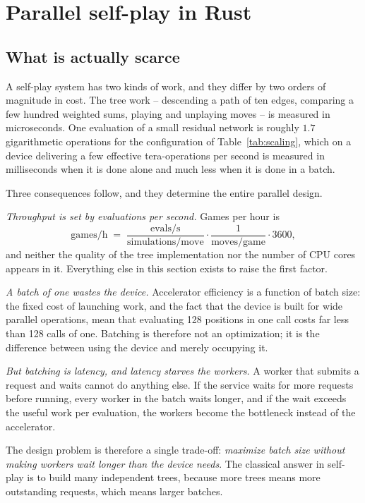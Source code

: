 \section{Parallel self-play in Rust}
\label{sec:parallel}

\subsection{What is actually scarce}
\label{sec:scarce}

A self-play system has two kinds of work, and they differ by two orders of
magnitude in cost. The tree work -- descending a path of ten edges, comparing a
few hundred weighted sums, playing and unplaying moves -- is measured in
microseconds. One evaluation of a small residual network is roughly $1.7$
gigarithmetic operations for the configuration of Table~\ref{tab:scaling}, which
on a device delivering a few effective tera-operations per second is measured in
milliseconds when it is done alone and much less when it is done in a batch.

Three consequences follow, and they determine the entire parallel design.

\emph{Throughput is set by evaluations per second.} Games per hour is
\begin{equation}
\text{games/h} \;=\; \frac{\text{evals/s}}{\text{simulations/move}}
\cdot \frac{1}{\text{moves/game}} \cdot 3600 ,
\label{eq:throughput}
\end{equation}
and neither the quality of the tree implementation nor the number of CPU cores
appears in it. Everything else in this section exists to raise the first factor.

\emph{A batch of one wastes the device.} Accelerator efficiency is a function of
batch size: the fixed cost of launching work, and the fact that the device is
built for wide parallel operations, mean that evaluating 128 positions in one
call costs far less than 128 calls of one. Batching is therefore not an
optimization; it is the difference between using the device and merely occupying
it.

\emph{But batching is latency, and latency starves the workers.} A worker that
submits a request and waits cannot do anything else. If the service waits for
more requests before running, every worker in the batch waits longer, and if the
wait exceeds the useful work per evaluation, the workers become the bottleneck
instead of the accelerator.

The design problem is therefore a single trade-off: \emph{maximize batch size
without making workers wait longer than the device needs}. The classical answer
in self-play is to build many independent trees, because more trees means more
outstanding requests, which means larger batches.

